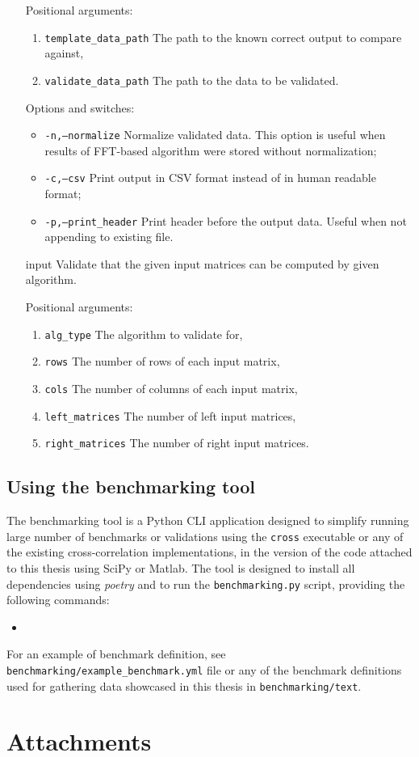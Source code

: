 \begin{itemize}
	Positional arguments:
	\begin{enumerate}
		\item \texttt{template\_data\_path} The path to the known correct output to compare against,
		\item \texttt{validate\_data\_path} The path to the data to be validated.
	\end{enumerate}

	Options and switches:
	\begin{itemize}
		\item \texttt{-n,--normalize} Normalize validated data. This option is useful when results of FFT-based algorithm were stored without normalization;
		\item \texttt{-c,--csv} Print output in CSV format instead of in human readable format;
		\item \texttt{-p,--print\_header} Print header before the output data. Useful when not appending to existing file.
	\end{itemize}
	\item[input] Validate that the given input matrices can be computed by given algorithm.
	
	Positional arguments:
	\begin{enumerate}
		\item \texttt{alg\_type} The algorithm to validate for,
		\item \texttt{rows} The number of rows of each input matrix,
		\item \texttt{cols} The number of columns of each input matrix,
		\item \texttt{left\_matrices} The number of left input matrices,
		\item \texttt{right\_matrices} The number of right input matrices.
	\end{enumerate}
\end{itemize}

\section{Using the benchmarking tool}
The benchmarking tool is a Python CLI application designed to simplify running large number of benchmarks or validations using the \texttt{cross} executable or any of the existing cross-correlation implementations, in the version of the code attached to this thesis using SciPy or Matlab. The tool is designed to install all dependencies using \textit{poetry} and to run the \texttt{benchmarking.py} script, providing the following commands:

\begin{itemize}
	\item
\end{itemize}

For an example of benchmark definition, see \texttt{benchmarking/example\_benchmark.yml} file or any of the benchmark definitions used for gathering data showcased in this thesis in \texttt{benchmarking/text}. 
\chapter{Attachments}